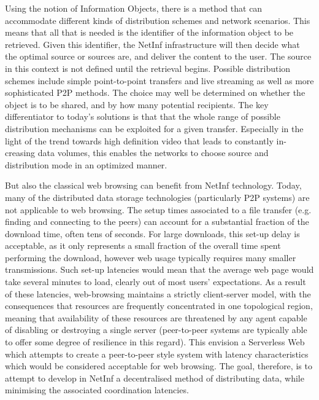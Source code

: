 Using the notion of Information Objects, there is a method that can accommodate different
kinds of distribution schemes and network scenarios. This means that all that is needed is the
identifier of the information object to be retrieved. Given this identifier, the NetInf infrastructure
will then decide what the optimal source or sources are, and deliver the content to the user.
The source in this context is not defined until the retrieval begins. Possible distribution
schemes include simple point-to-point transfers and live streaming as well as more sophisticated P2P methods. The choice may well be determined on whether the object is to be
shared, and by how many potential recipients. The key differentiator to today’s solutions is that
that the whole range of possible distribution mechanisms can be exploited for a given transfer.
Especially in the light of the trend towards high definition video that leads to constantly in-
creasing data volumes, this enables the networks to choose source and distribution mode in
an optimized manner.

But also the classical web browsing can benefit from NetInf technology. Today, many of the
distributed data storage technologies (particularly P2P systems) are not applicable to web
browsing. The setup times associated to a file transfer (e.g. finding and connecting to the
peers) can account for a substantial fraction of the download time, often tens of seconds. For
large downloads, this set-up delay is acceptable, as it only represents a small fraction of the
overall time spent performing the download, however web usage typically requires many
smaller transmissions. Such set-up latencies would mean that the average web page would
take several minutes to load, clearly out of most users’ expectations. As a result of these
latencies, web-browsing maintains a strictly client-server model, with the consequences that
resources are frequently concentrated in one topological region, meaning that availability of
these resources are threatened by any agent capable of disabling or destroying a single
server (peer-to-peer systems are typically able to offer some degree of resilience in this
regard). This envision a Serverless Web which attempts to create a peer-to-peer style system
with latency characteristics which would be considered acceptable for web browsing. The
goal, therefore, is to attempt to develop in NetInf a decentralised method of distributing data,
while minimising the associated coordination latencies.

